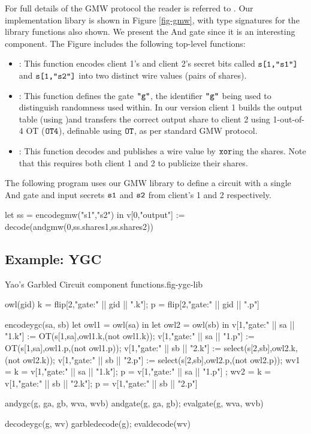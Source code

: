 For full details of the GMW protocol the reader is referred to
\cite{evans2018pragmatic}. Our implementation libary is shown in
Figure \ref{fig-gmw}, with type signatures for the library functions
also shown. We present the And gate since it is
an interesting component. The Figure includes the
following top-level functions:
\begin{itemize}
\item {}: This function encodes client 1's and client 2's
  secret bits called $\texttt{s[1,"s1"]}$ and $\texttt{s[1,"s2"]}$ into two
  distinct wire values (pairs of shares).
\item {}: This function defines the gate $\texttt{"g"}$, the
  identifier $\texttt{"g"}$ being used to distinguish randomness used
  within.  In our version client 1 builds the output table (using
  )and transfers the correct output share to client 2
  using 1-out-of-4 OT ($\texttt{OT4}$), definable using $\texttt{OT}$, as
  per standard GMW protocol.
\item {}: This function decodes and publishes a wire value
  by $\texttt{xor}$ing the shares. Note that this requires both client 1
  and 2 to publicize their shares.
\end{itemize}
\begin{example}
  \label{example-gmw-andcircuit}
The following program uses our GMW library to define
a circuit with a single And gate and input secrets $\texttt{s1}$ and
$\texttt{s2}$ from client's 1 and 2 respectively. 
{\small
  \begin{verbatimtab}
  let ss = encodegmw("s1","s2") in v[0,"output"] := decode(andgmw(0,ss.shares1,ss.shares2)) \end{verbatimtab}
}
\end{example}

\subsection{Example: YGC}
\label{section-metalang-ygc}

\begin{fpfig}[t]{Yao's Garbled Circuit component functions.}{fig-ygc-lib}
{\footnotesize
\begin{verbatimtab}
  owl(gid) { { k = flip[2,"gate:" || gid || ".k"]; p = flip[2,"gate:" || gid || ".p"] } }

  encodeygc(sa, sb) {
    let owl1 = owl(sa) in
    let owl2 = owl(sb) in
    v[1,"gate:" || sa || "1.k"] := OT(s[1,sa],owl1.k,(not owl1.k));
    v[1,"gate:" || sa || "1.p"] := OT(s[1,sa],owl1.p,(not owl1.p));
    v[1,"gate:" || sb || "2.k"] := select(s[2,sb],owl2.k,(not owl2.k));
    v[1,"gate:" || sb || "2.p"] := select(s[2,sb],owl2.p,(not owl2.p));
    { wv1 = { k = v[1,"gate:" || sa || "1.k"]; p = v[1,"gate:" || sa || "1.p"] };
      wv2 = { k = v[1,"gate:" || sb || "2.k"]; p = v[1,"gate:" || sb || "2.p"] } }
  }

  andygc(g, ga, gb, wva, wvb) { andgate(g, ga, gb); evalgate(g, wva, wvb) }

  decodeygc(g, wv) { garbledecode(g); evaldecode(wv) }
\end{verbatimtab}
}
\end{fpfig}

